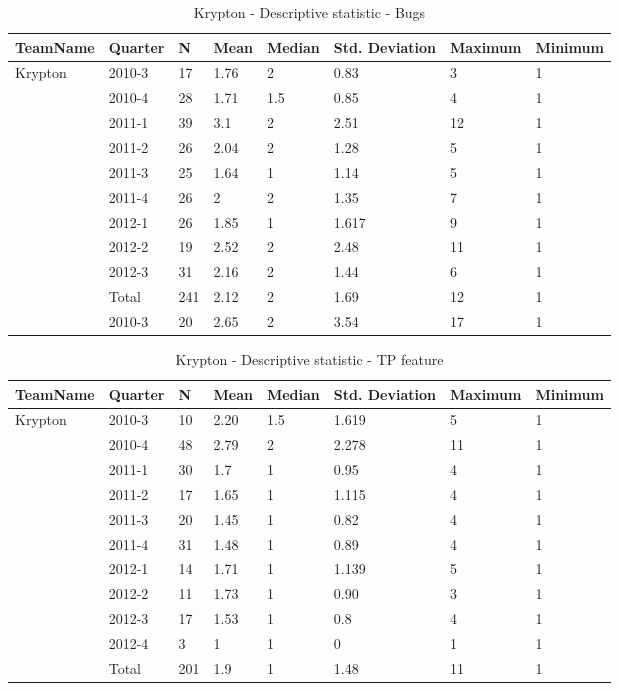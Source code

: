 \documentclass[UKenglish]{ifimaster}  %
\begin{document}
\begin{table}[!htbp]
\begin{tabular}{ | l | l | l | l | l | l | l | l | }
\hline
TeamName & Quarter & N & Mean & Median & Std. Deviation & Maximum & Minimum \\ \hline
Krypton & 2010-3 & 17 & 1.76 & 2 & 0.83 & 3 & 1 \\ \hline
	&2010-4 & 28 & 1.71 & 1.5 & 0.85 & 4 & 1  \  \\ \hline
	 & 2011-1 & 39 & 3.1 & 2 & 2.51 & 12 & 1 \\ \hline
	 & 2011-2 & 26 & 2.04 & 2 & 1.28 & 5 & 1 \\ \hline
	 & 2011-3 & 25 & 1.64 & 1 & 1.14 & 5 & 1 \\ \hline
	 & 2011-4 & 26 & 2 & 2 & 1.35 & 7 & 1 \\ \hline
	 & 2012-1 & 26 & 1.85 & 1 & 1.617 & 9 & 1 \\ \hline
	 & 2012-2 & 19 & 2.52 & 2 & 2.48 & 11 & 1 \\ \hline
	 & 2012-3 & 31 & 2.16 & 2 & 1.44 & 6 & 1 \\ \hline
	 & Total & 241 & 2.12 & 2 & 1.69 & 12 & 1 \\ \hline
	 & 2010-3 & 20 & 2.65 & 2 & 3.54 & 17 & 1 \\ \hline
\end{tabular}
\caption{Krypton - Descriptive statistic - Bugs}
\end{table}

\begin{table}[!htbp]
\begin{tabular}{ | l | l | l | l | l | l | l | l | }
\hline
TeamName & Quarter & N & Mean & Median & Std. Deviation & Maximum & Minimum \\ \hline
Krypton & 2010-3 & 10 & 2.20 & 1.5 & 1.619 & 5 & 1 \\ \hline
	 & 2010-4 & 48 & 2.79 & 2 & 2.278 & 11 & 1 \\ \hline
	 & 2011-1 & 30 & 1.7 & 1 & 0.95 & 4 & 1 \\ \hline
	 & 2011-2 & 17 & 1.65 & 1 & 1.115 & 4 & 1 \\ \hline
	 & 2011-3 & 20 & 1.45 & 1 & 0.82& 4 & 1 \\ \hline
	 & 2011-4 & 31 & 1.48 & 1 & 0.89 & 4 & 1 \\ \hline
	 & 2012-1 & 14 & 1.71 & 1 & 1.139 & 5 & 1 \\ \hline
	 & 2012-2 & 11 & 1.73 & 1 & 0.90& 3 & 1 \\ \hline
	 & 2012-3 & 17 & 1.53 & 1 & 0.8 & 4 & 1 \\ \hline
	 & 2012-4 & 3 & 1 & 1 & 0 & 1 & 1 \\ \hline
	 & Total & 201 & 1.9 & 1 & 1.48 & 11 & 1 \\ \hline
\end{tabular}
\caption{Krypton - Descriptive statistic  - TP feature}
\end{table}
\end{document}
